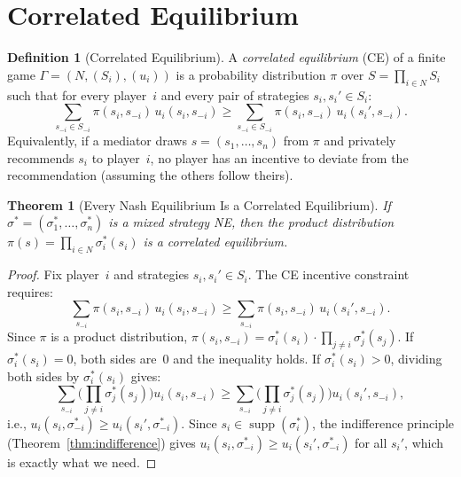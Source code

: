 \documentclass[11pt,a4paper]{article}
\theoremstyle{definition}
\newtheorem{definition}{Definition}[section]
\theoremstyle{plain}
\newtheorem{theorem}{Theorem}[section]
\theoremstyle{remark}
\DeclareMathOperator{\supp}{supp}
\begin{document}
\section{Correlated Equilibrium}
\label{sec:correlated}

\begin{definition}[Correlated Equilibrium]
\label{def:ce}
A \emph{correlated equilibrium} (CE) of a finite game $\Gamma = (N, (S_i), (u_i))$
is a probability distribution $\pi$ over $S = \prod_{i \in N} S_i$ such that for
every player~$i$ and every pair of strategies $s_i, s_i' \in S_i$:
\[
    \sum_{s_{-i} \in S_{-i}} \pi(s_i, s_{-i})\, u_i(s_i, s_{-i})
    \geq \sum_{s_{-i} \in S_{-i}} \pi(s_i, s_{-i})\, u_i(s_i', s_{-i}).
\]
Equivalently, if a mediator draws $s = (s_1, \ldots, s_n)$ from $\pi$ and
privately recommends $s_i$ to player~$i$, no player has an incentive to deviate
from the recommendation (assuming the others follow theirs).
\end{definition}

\begin{theorem}[Every Nash Equilibrium Is a Correlated Equilibrium]
\label{thm:ne_is_ce}
If $\sigma^* = (\sigma_1^*, \ldots, \sigma_n^*)$ is a mixed strategy NE, then the
product distribution $\pi(s) = \prod_{i \in N} \sigma_i^*(s_i)$ is a correlated
equilibrium.
\end{theorem}

\begin{proof}
Fix player~$i$ and strategies $s_i, s_i' \in S_i$. The CE incentive constraint
requires:
\[
    \sum_{s_{-i}} \pi(s_i, s_{-i})\, u_i(s_i, s_{-i})
    \geq \sum_{s_{-i}} \pi(s_i, s_{-i})\, u_i(s_i', s_{-i}).
\]
Since $\pi$ is a product distribution, $\pi(s_i, s_{-i}) = \sigma_i^*(s_i) \cdot
\prod_{j \neq i} \sigma_j^*(s_j)$. If $\sigma_i^*(s_i) = 0$, both sides are~0
and the inequality holds. If $\sigma_i^*(s_i) > 0$, dividing both sides by
$\sigma_i^*(s_i)$ gives:
\[
    \sum_{s_{-i}} \bigg(\prod_{j \neq i} \sigma_j^*(s_j)\bigg) u_i(s_i, s_{-i})
    \geq \sum_{s_{-i}} \bigg(\prod_{j \neq i} \sigma_j^*(s_j)\bigg) u_i(s_i', s_{-i}),
\]
i.e., $u_i(s_i, \sigma_{-i}^*) \geq u_i(s_i', \sigma_{-i}^*)$.
Since $s_i \in \supp(\sigma_i^*)$, the indifference principle
(Theorem~\ref{thm:indifference}) gives
$u_i(s_i, \sigma_{-i}^*) \geq u_i(s_i', \sigma_{-i}^*)$ for all $s_i'$, which is
exactly what we need.
\end{proof}
\end{document}
